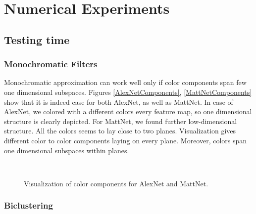 \section{Numerical Experiments}

\subsection{Testing time}
    
\subsubsection{Monochromatic Filters}
Monochromatic approximation can work well only if color components span few one dimensional subspaces. 
Figures \ref{AlexNetComponents}, \ref{MattNetComponents} show that it is indeed case for both AlexNet, as
well as MattNet. In case of AlexNet, we colored with a different colors every feature map, so one dimensional structure
is clearly depicted. For MattNet, we found further low-dimensional structure. All the colors seems to lay close
to two planes. Visualization gives different color to color components laying on every plane. Moreover,
colors span one dimensional subspaces within planes.

\begin{figure}[t]
\mbox{
  \quad
{}
}
\caption{Visualization of color components for AlexNet and MattNet.}
\end{figure}



\subsubsection{Biclustering}

